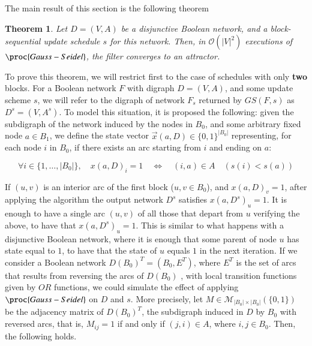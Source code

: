 \documentclass[preprint,12pt]{elsarticle}
\newcommand{\GS}{\textit{GS}}
\newtheorem {teo}{Theorem}
\begin{document}
The main result of this section is the following theorem  

\begin{teo}\label{teo-conv-gen}
Let $D=(V,A)$ be a disjunctive Boolean network, and a block-sequential update schedule $s$ for this network. Then, in $\mathcal{O}(|V|^2)$ executions of $\proc{Gauss-Seidel}$, the filter converges to an attractor.
\end{teo}

To prove this theorem, we will restrict first to the case of schedules with only \textbf{two} blocks. For a Boolean network $F$ with digraph $D=(V,A)$, and some update scheme $s$, we will refer to the digraph of network $F_s$ returned by $\GS(F,s)$ as $D^s=(V,A^s)$. To model this situation, it is proposed the following: given the subdigraph of the network induced by the nodes in $B_0$, %
and some arbitrary fixed node $a \in B_1$, we define the state vector $\vec{x}(a,D) \in \{0,1\}^{|B_0|}$ representing, for each node $i$ in $B_0$, if there exists an arc starting from $i$ and ending on $a$:  

\begin{equation}\label{def-vect-filt}
\forall i \in \{1,\ldots,|B_0|\},\quad x(a,D)_i=1\quad \Longleftrightarrow\quad (i,a) \in A \quad (s(i)<s(a))
\end{equation}

If $(u,v)$ is an interior arc of the first block ($u,v \in B_0$), and $x(a,D)_v=1$, after applying the algorithm the output network $D^s$ satisfies $x(a,D^s)_u=1$. It is enough to have a single arc $(u,v)$ of all those that depart from $u$ verifying the above, to have that $x(a,D^s)_u=1$. This is similar to what happens with a disjunctive Boolean network, %
where it is enough that some parent of node $u$ has state equal to $1$, to have that the state of $u$ equals $1$ in the next iteration. If we consider a Boolean network $D(B_0)^T=(B_0,E^T)$, where $E^T$ is the set of arcs that results from reversing the arcs of $D(B_0)$%
, with local transition functions given by $OR$ functions, we could simulate the effect of applying $\proc{Gauss-Seidel}$ on $D$ and $s$. More precisely, let $M \in \mathcal{M}_{|B_0|\times |B_0|}(\{0,1\})$ be the adjacency matrix of $D(B_0)^T$, the subdigraph induced in $D$ by $B_0$ with reversed arcs, that is,  
$M_{ij}=1$ if and only if $(j,i)\in A$, where $i,j \in B_0$. Then, the following holds.
\end{document}

